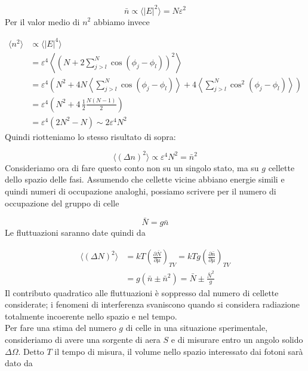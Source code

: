 \documentclass[a4paper]{report}
\begin{document}
\begin{equation}
    \bar{n} \propto \langle|E|^2\rangle = N \varepsilon^2
\end{equation}
Per il valor medio di $n^2$ abbiamo invece

\begin{equation}
    \begin{split}
        \langle n^2 \rangle & \propto \langle |E|^4 \rangle \\
        & = \varepsilon^4 \left\langle \left(N + 2 \sum_{j>l}^{N} \cos(\phi_j-\phi_l)\right)^2\right\rangle \\
        & = \varepsilon^4 \left( N^2 + 4N \left\langle \sum_{j>l}^{N} \cos(\phi_j-\phi_l) \right\rangle + 4 \left\langle \sum_{j>l}^{N} \cos^2(\phi_j-\phi_l) \right\rangle \right)\\
        & = \varepsilon^4 \left(N^2 + 4\, \frac{1}{2}\frac{N(N-1)}{2} \right) \\
        & = \varepsilon^4 (2N^2-N) \sim 2\varepsilon^4 N^2
    \end{split}
\end{equation}
Quindi riotteniamo lo stesso risultato di sopra:

\begin{equation}
    \langle (\Delta n)^2 \rangle \propto \varepsilon^4 N^2 = \bar{n}^2
\end{equation}
Consideriamo ora di fare questo conto non su un singolo stato, ma su $g$ cellette dello spazio delle fasi. Assumendo che cellette vicine abbiano energie simili e quindi numeri di occupazione analoghi, possiamo scrivere per il numero di occupazione del gruppo di celle

\begin{equation}
    \bar{N} = g \bar{n}
\end{equation}
Le fluttuazioni saranno date quindi da

\begin{equation}
    \begin{split}
        \langle (\Delta N)^2 \rangle & = k T \left(\frac{\partial \bar{N}}{\partial \mu}\right)_{TV} = k T g \left(\frac{\partial \bar{n}}{\partial \mu}\right)_{TV} \\
        & = g(\bar{n}\pm \bar{n}^2) = \bar{N} \pm \frac{\bar{N}^2}{g}
    \end{split}
\end{equation}
Il contributo quadratico alle fluttuazioni è soppresso dal numero di cellette considerate; i fenomeni di interferenza svaniscono quando si considera radiazione totalmente incoerente nello spazio e nel tempo. \\
Per fare una stima del numero $g$ di celle in una situazione sperimentale, consideriamo di avere una sorgente di aera $S$ e di misurare entro un angolo solido $\Delta \Omega$. Detto $T$ il tempo di misura, il volume nello spazio interessato dai fotoni sarà dato da
\end{document}
